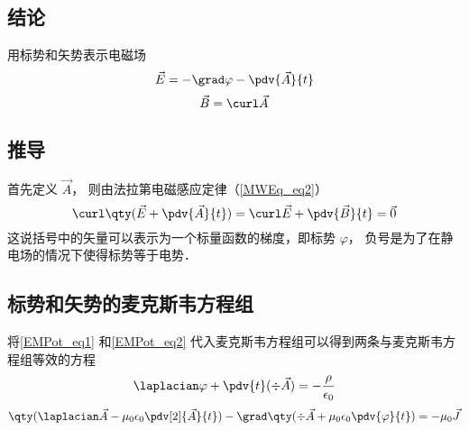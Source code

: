 \subsection{结论}
用标势和矢势表示电磁场
\begin{equation}\label{EMPot_eq1}
\vec E = -\grad \varphi - \pdv{\vec A}{t}
\end{equation}
\begin{equation}\label{EMPot_eq2}
\vec B = \curl \vec A
\end{equation}

\subsection{推导}
首先定义 $\vec A$， 则由法拉第电磁感应定律（\autoref{MWEq_eq2}）
\begin{equation}
\curl \qty(\vec E + \pdv{\vec A}{t}) = \curl \vec E + \pdv{\vec B}{t} = \vec 0
\end{equation}
这说括号中的矢量可以表示为一个标量函数的梯度，即标势 $\varphi$， 负号是为了在静电场的情况下使得标势等于电势．

\subsection{标势和矢势的麦克斯韦方程组}

将\autoref{EMPot_eq1} 和\autoref{EMPot_eq2} 代入麦克斯韦方程组可以得到两条与麦克斯韦方程组等效的方程
\begin{equation}\label{EMPot_eq4}
\laplacian \varphi + \pdv{t} (\div \vec A) = -\frac{\rho}{\epsilon_0}
\end{equation}
\begin{equation}\label{EMPot_eq5}
\qty(\laplacian \vec A - \mu_0\epsilon_0 \pdv[2]{\vec A}{t}) - \grad \qty(\div \vec A + \mu_0\epsilon_0 \pdv{\varphi}{t}) = -\mu_0\vec J
\end{equation}

